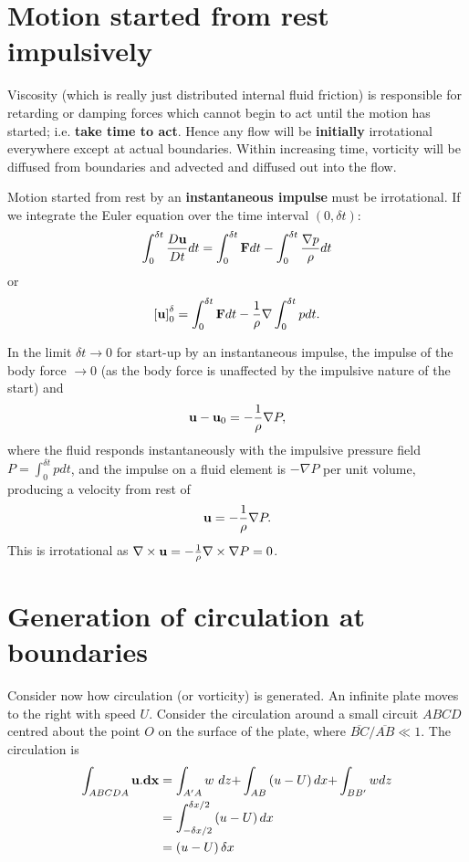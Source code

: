 \documentclass[10pt]{report}
\begin{document}
\section{Motion started from rest impulsively}
Viscosity (which is really just distributed internal fluid friction) is
responsible for retarding or damping forces which cannot begin to act until
the motion has started; i.e. \textbf{take time to act}. Hence any flow will
be \textbf{initially} irrotational everywhere except at actual boundaries.
Within increasing time, vorticity will be diffused from boundaries and
advected and diffused out into the flow.

Motion started from rest by an \textbf{instantaneous impulse} must be
irrotational. If we integrate the Euler equation over the time interval $(0,
\delta t)$:
\[
\int_0^{\delta t} {\frac{D{{\bf u}}}{Dt}}
dt=\int_0^{\delta t} {{\bf F}} dt-\int_0^{\delta t}
{\frac{\nabla p}{\rho }} dt
\]
or
\[\left[ {{\bf u}} \right]_0^\delta =\int_0^{\delta t} {\rm
{\bf F}} dt-\frac{1}{\rho }\nabla \int_0^{\delta t} p dt. \]

In the limit $\delta t \to  0$ for start-up by an instantaneous impulse,
the impulse of the body force $\to  0$ (as the body force is unaffected by
the impulsive nature of the start) and
\[
{{\bf u}}-{{\bf u}}_{{0}} =-\frac{1}{\rho }\nabla P,
\]
where the fluid responds instantaneously with the impulsive pressure field
$P=\int_0^{\delta t} {pdt} $, and the impulse on a fluid element is
$-\nabla P$ per unit volume, producing a velocity from rest of
\begin{equation}
{{\bf u}}=-\frac{1}{\rho }\nabla P.
\label{eq:impulsive-pressure-gradient-flow}
\end{equation}
This is irrotational as $\nabla \times {{\bf u}}=-\frac{1}{\rho }\nabla
\times \nabla P={{0}}$.

\section{Generation of circulation at boundaries}

Consider now how circulation (or vorticity) is generated. An infinite plate
moves to the right with speed $U$. Consider the circulation around a small
circuit $ABCD$ centred about the point $O$ on the surface of the plate, where
${\overline {BC} } / {\overline {AB} }\ll 1$. The
circulation is
\begin{align*}
 \int_{ABCDA} {{{\bf u}}. {{\bf dx}}}
 & =\int_{{A}'A} {w\ dz+} \int_{AB} {\left( {u-U} \right)dx+}
\int_{B{B}'} {wdz} \\
 & =\int_{{-\delta x} / 2}^{{\delta x}/ 2} {\left( {u-U}
\right)dx} \\
 & =\left( {u-U} \right)\delta x \\
 \end{align*}
\end{document}
